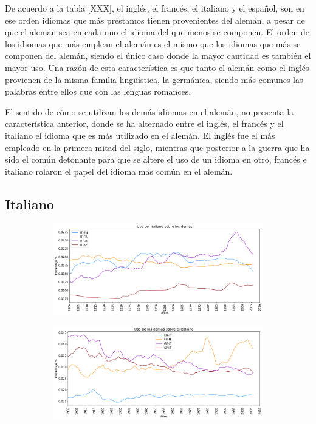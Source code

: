 De acuerdo a la tabla [XXX],  el inglés, el francés, el italiano y el español, son en ese orden idiomas que más préstamos tienen provenientes del alemán, a pesar de que el alemán sea en cada uno el idioma del que menos se componen.  El orden de los idiomas que más emplean el alemán es el mismo que los idiomas que más se componen del alemán, siendo el único caso donde la mayor cantidad es también el mayor uso. Una razón de esta característica es que tanto el alemán como el inglés provienen de la misma familia lingüística, la germánica,  siendo más comunes las palabras entre ellos  que con las lenguas romances.

El sentido de cómo se utilizan los demás idiomas en el alemán, no presenta la característica anterior,   donde se ha alternado entre el inglés, el francés y el italiano el idioma que es más utilizado en el alemán.  El inglés fue el más empleado en la primera mitad del siglo, mientras que posterior a la guerra que ha sido el común detonante para que se altere el uso de un idioma en otro,  francés e italiano rolaron el papel del idioma más común en el alemán. 


\newpage
\subsection{Italiano}

\begin{figure}[h!]
	
	\begin{subfigure}{}
		\centering
		\includegraphics[scale=.38]{Cap_4/PF1_S2_IT.png}
		\caption{}
		\label{fig:ST_IT_a}
	\end{subfigure}
	
	\begin{subfigure}{}
		\centering
		\includegraphics[scale=.38]{Cap_4/PF2_S2_IT.png}
		\caption{}
		\label{fig:ST_IT_b}
	\end{subfigure}
	
\end{figure}

